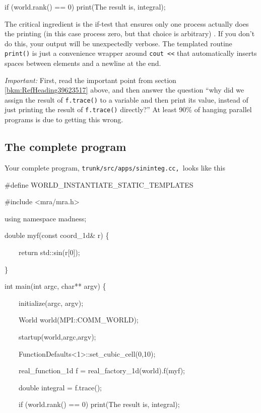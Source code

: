 \documentclass[letterpaper]{article}
\begin{document}
{\ttfamily
if (world.rank() == 0) print({\textquotedbl}The result is{\textquotedbl}, integral);}


\bigskip

The critical ingredient is the if-test that ensures only one process actually does the printing (in this case process
zero, but that choice is arbitrary) . If you don't do this, your output will be unexpectedly verbose. The templated
routine \texttt{print()} is just a convenience wrapper around \texttt{cout {\textless}{\textless}} that automatically
inserts spaces between elements and a newline at the end.

\textit{Important:}\textbf{ }First, read the important point from section \ref{bkm:RefHeading39623517} above, and then
answer the question ``why did we assign the result of \texttt{f.trace()} to a variable and then print its value,
instead of just printing the result of \texttt{f.trace()} directly?'' At least 90\% of hanging parallel programs is due
to getting this wrong.

\subsection{The complete program}
Your complete program, \texttt{trunk}\texttt{/src/apps/sininteg.cc, }looks like this

{\ttfamily
\#define WORLD\_INSTANTIATE\_STATIC\_TEMPLATES \ }

{\ttfamily
\#include {\textless}mra/mra.h{\textgreater}}

{\ttfamily
using namespace madness;}

{\ttfamily
double myf(const coord\_1d\& r) \{}

{\ttfamily
\ \ \ \ return std::sin(r[0]);}

{\ttfamily
\}}

{\ttfamily
int main(int argc, char** argv) \{}

{\ttfamily
\ \ \ \ initialize(argc, argv);}

{\ttfamily
\ \ \ \ World world(MPI::COMM\_WORLD);}

{\ttfamily
\ \ \ \ startup(world,argc,argv);}

{\ttfamily
\ \ \ \ FunctionDefaults{\textless}1{\textgreater}::set\_cubic\_cell(0,10);}

{\ttfamily
\ \ \ \ real\_function\_1d f = real\_factory\_1d(world).f(myf);}

{\ttfamily
\ \ \ \ double integral = f.trace();}

{\ttfamily
\ \ \ \ if (world.rank() == 0) print({\textquotedbl}The result is{\textquotedbl}, integral);}
\end{document}
